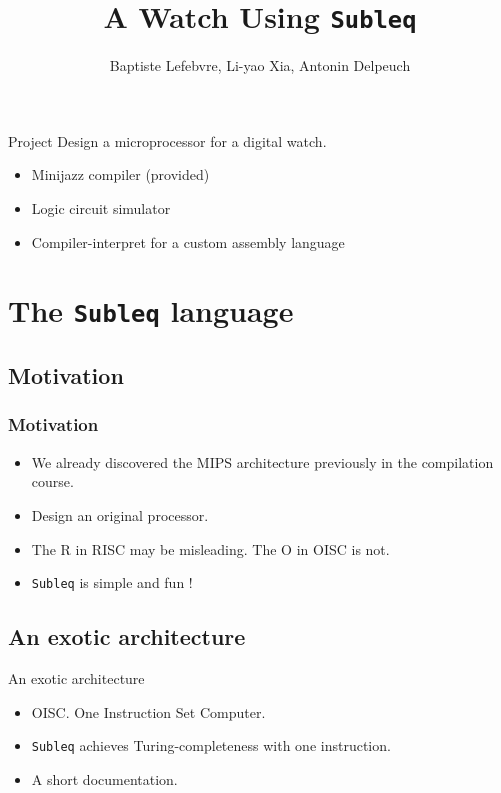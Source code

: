 \documentclass{beamer}
\title{A Watch Using \texttt{Subleq}}
\author{Baptiste Lefebvre, Li-yao Xia, Antonin Delpeuch}
\date{\begin{tikzpicture}[scale=0.25, every node/.style={transform shape}]
        \node at (0,0) (n0) {};
        \SSGNb[0.75cm]{n0}{2}
        \node at (1,0) (n1) {};
        \SSGNb[0.75cm]{n1}{0}
        \node at (2,0) (n2) {};
        \SSGNb[0.75cm]{n2}{1}
        \node at (3,0) (n3) {};
        \SSGNb[0.75cm]{n3}{3}
        \node at (4.5,0) (n4) {};
        \SSGNb[0.75cm]{n4}{0}
        \node at (5.5,0) (n5) {};
        \SSGNb[0.75cm]{n5}{1}
        \node at (7,0) (n6) {};
        \SSGNb[0.75cm]{n6}{2}
        \node at (8,0) (n7) {};
        \SSGNb[0.75cm]{n7}{2}
        \node at (9.5,0) (n8) {};
        \SSGNb[0.75cm]{n8}{1}
        \node at (10.5,0) (n9) {};
        \SSGNb[0.75cm]{n9}{5}
        \node at (12,0) (n10) {};
        \SSGNb[0.75cm]{n10}{5}
        \node at (13,0) (n11) {};
        \SSGNb[0.75cm]{n11}{5}
  \end{tikzpicture}}
\begin{document}
\makeatletter

\begin{frame}
    \maketitle
\end{frame}


\begin{frame}{Project}
  Design a microprocessor for a digital watch.
  \begin{itemize}
    \item Minijazz compiler (provided)
    \item Logic circuit simulator
    \item Compiler-interpret for a custom assembly language
  \end{itemize}
\end{frame}

\section{The \texttt{Subleq} language}
\subsection{Motivation}
\begin{frame}
  \frametitle{Motivation}
  \begin{itemize}
    \item We already discovered the MIPS architecture previously
      in the compilation course.
    \item<2-> Design an original processor.
    \item<3-> The R in RISC may be misleading. The O in OISC is not.
    \item<4-> \texttt{Subleq} is simple and fun !
  \end{itemize}
\end{frame}

\subsection{An exotic architecture}
\begin{frame}{An exotic architecture}
  \begin{itemize}
    \item OISC. One Instruction Set Computer.
    \item<2-> \texttt{Subleq} achieves Turing-completeness
      with one instruction.
    \item<3-> A short documentation. %
  \end{itemize}
\end{frame}
\end{document}
